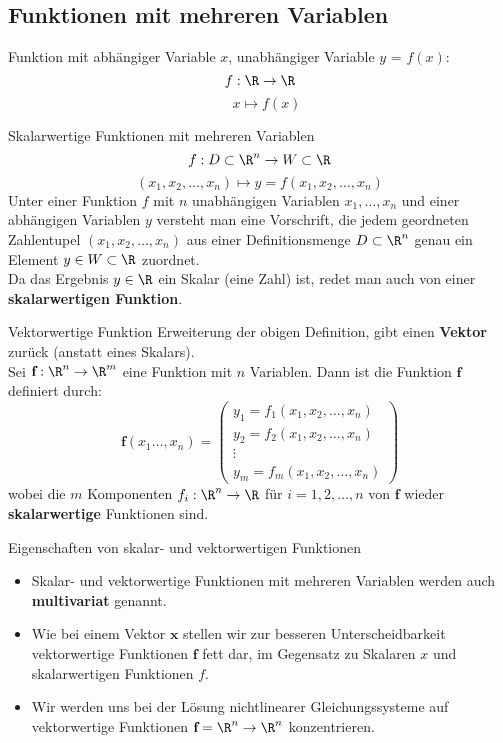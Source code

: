 \subsection{Funktionen mit mehreren Variablen}

\begin{lemma}{Funktion} mit abhängiger Variable $x$, unabhängiger Variable $y$ = $f(x)$:
    $$f: \R \to \R$$
    $$\quad x \mapsto f(x)$$
\end{lemma}

\begin{definition}{Skalarwertige Funktionen mit mehreren Variablen}
    $$f: D \subset \R^n \to W \subset \R$$
    $$(x_1, x_2, \ldots, x_n) \mapsto y = f(x_1, x_2, \ldots, x_n)$$
    Unter einer Funktion $f$ mit $n$ unabhängigen Variablen $x_1, \ldots, x_n$ und einer abhängigen Variablen $y$ versteht man eine Vorschrift, 
    die jedem geordneten Zahlentupel $(x_1, x_2, \ldots, x_n)$ aus einer Definitionsmenge $D \subset \R^n$ genau ein Element $y \in W \subset \R$ zuordnet.
    \vspace{2mm} \\
    Da das Ergebnis $y \in \R$ ein Skalar (eine Zahl) ist, redet man auch von einer \textbf{skalarwertigen Funktion}.
\end{definition}

\begin{concept}{Vektorwertige Funktion} Erweiterung der obigen Definition, gibt einen \textbf{Vektor} zurück (anstatt eines Skalars).\\
    Sei $\textbf{f}: \R^n \to \R^m$ eine Funktion mit $n$ Variablen. Dann ist die Funktion $\textbf{f}$ definiert durch:
    $$\textbf{f}(x_1 \ldots, x_n) = \begin{pmatrix} y_1 = f_1(x_1, x_2, \ldots, x_n) \\ y_2 = f_2(x_1, x_2, \ldots, x_n) \\ \vdots \\ y_m = f_m(x_1, x_2, \ldots, x_n) \end{pmatrix}$$
    wobei die $m$ Komponenten $f_i: \R^n \to \R$ für $i = 1, 2, \ldots, n$ von $\textbf{f}$ wieder \textbf{skalarwertige} Funktionen sind.
\end{concept}

\begin{corollary}{Eigenschaften von skalar- und vektorwertigen Funktionen}
    \begin{itemize}
        \item Skalar- und vektorwertige Funktionen mit mehreren Variablen werden auch \textbf{multivariat} genannt.
        \item Wie bei einem Vektor $\textbf{x}$ stellen wir zur besseren Unterscheidbarkeit vektorwertige Funktionen $\textbf{f}$ fett dar, im Gegensatz zu Skalaren $x$ und skalarwertigen Funktionen $f$.
        \item Wir werden uns bei der Lösung nichtlinearer Gleichungssysteme auf vektorwertige Funktionen $\textbf{f} = \R^n \to \R^n$ konzentrieren.
    \end{itemize}
\end{corollary}

